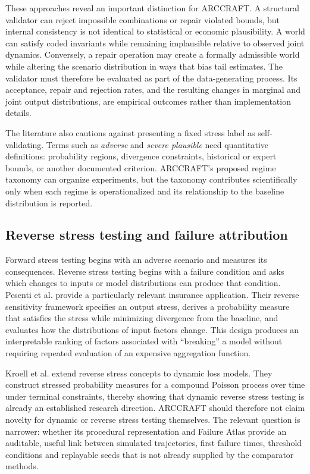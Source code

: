 These approaches reveal an important distinction for ARCCRAFT. A structural validator can reject impossible combinations or repair violated bounds, but internal consistency is not identical to statistical or economic plausibility. A world can satisfy coded invariants while remaining implausible relative to observed joint dynamics. Conversely, a repair operation may create a formally admissible world while altering the scenario distribution in ways that bias tail estimates. The validator must therefore be evaluated as part of the data-generating process. Its acceptance, repair and rejection rates, and the resulting changes in marginal and joint output distributions, are empirical outcomes rather than implementation details.

The literature also cautions against presenting a fixed stress label as self-validating. Terms such as \emph{adverse} and \emph{severe plausible} need quantitative definitions: probability regions, divergence constraints, historical or expert bounds, or another documented criterion. ARCCRAFT's proposed regime taxonomy can organize experiments, but the taxonomy contributes scientifically only when each regime is operationalized and its relationship to the baseline distribution is reported.

\subsection{Reverse stress testing and failure attribution}\label{sec:reverse-stress-testing-and-failure-attribution}

Forward stress testing begins with an adverse scenario and measures its consequences. Reverse stress testing begins with a failure condition and asks which changes to inputs or model distributions can produce that condition. Pesenti et al. \cite{Pesenti2019} provide a particularly relevant insurance application. Their reverse sensitivity framework specifies an output stress, derives a probability measure that satisfies the stress while minimizing divergence from the baseline, and evaluates how the distributions of input factors change. This design produces an interpretable ranking of factors associated with “breaking” a model without requiring repeated evaluation of an expensive aggregation function.

Kroell et al. \cite{Kroell2024} extend reverse stress concepts to dynamic loss models. They construct stressed probability measures for a compound Poisson process over time under terminal constraints, thereby showing that dynamic reverse stress testing is already an established research direction. ARCCRAFT should therefore not claim novelty for dynamic or reverse stress testing themselves. The relevant question is narrower: whether its procedural representation and Failure Atlas provide an auditable, useful link between simulated trajectories, first failure times, threshold conditions and replayable seeds that is not already supplied by the comparator methods.

